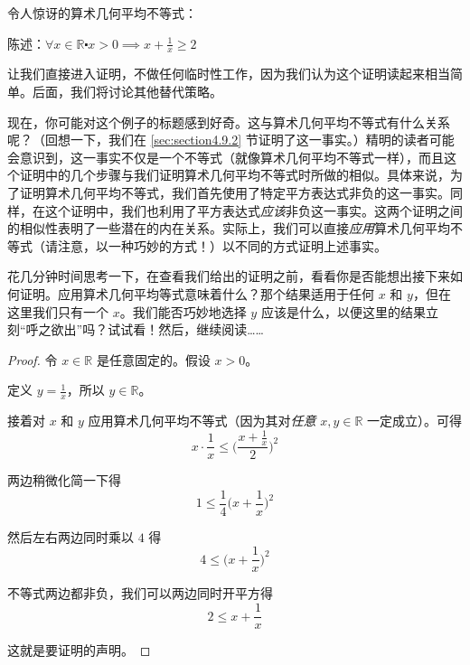\begin{example}
    令人惊讶的算术几何平均不等式：

    陈述：$\forall x \in \mathbb{R} \centerdot x > 0 \implies x + \frac{1}{x} \ge 2$
\end{example}

让我们直接进入证明，不做任何临时性工作，因为我们认为这个证明读起来相当简单。后面，我们将讨论其他替代策略。

\begin{center}
    \noindent {}
\end{center}

现在，你可能对这个例子的标题感到好奇。这与算术几何平均不等式有什么关系呢？（回想一下，我们在 \ref{sec:section4.9.2} 节证明了这一事实。）精明的读者可能会意识到，这一事实不仅是一个不等式（就像算术几何平均不等式一样），而且这个证明中的几个步骤与我们证明算术几何平均不等式时所做的相似。具体来说，为了证明算术几何平均不等式，我们首先使用了特定平方表达式非负的这一事实。同样，在这个证明中，我们也利用了平方表达式\emph{应该}非负这一事实。这两个证明之间的相似性表明了一些潜在的内在关系。实际上，我们可以直接\emph{应用}算术几何平均不等式（请注意，以一种巧妙的方式！）以不同的方式证明上述事实。

花几分钟时间思考一下，在查看我们给出的证明之前，看看你是否能想出接下来如何证明。应用算术几何平均等式意味着什么？那个结果适用于任何 $x$ 和 $y$，但在这里我们只有一个 $x$。我们能否巧妙地选择 $y$ 应该是什么，以便这里的结果立刻``呼之欲出''吗？试试看！然后，继续阅读……

\begin{proof}
    令 $x \in \mathbb{R}$ 是任意固定的。假设 $x>0$。

    定义 $y = \frac{1}{x}$，所以 $y \in \mathbb{R}$。

    接着对 $x$ 和 $y$ 应用算术几何平均不等式（因为其对\emph{任意} $x,y \in \mathbb{R}$ 一定成立）。可得
    \[x \cdot \frac{1}{x} \le \Big(\frac{x+\frac{1}{x}}{2}\Big)^2\]

    两边稍微化简一下得
    \[1 \le \frac{1}{4}\Big(x+\frac{1}{x}\Big)^2\]

    然后左右两边同时乘以 $4$ 得
    \[4 \le \Big(x+\frac{1}{x}\Big)^2\]

    不等式两边都非负，我们可以两边同时开平方得
    \[2 \le x+\frac{1}{x}\]

    这就是要证明的声明。
\end{proof}

